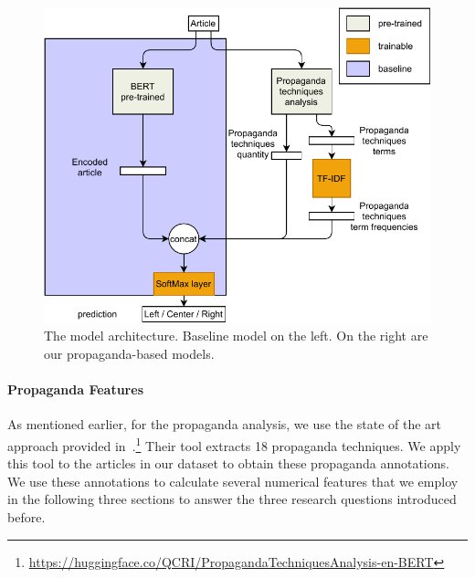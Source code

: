 \begin{figure}[!htb]
    \centering
    \includegraphics[width=\linewidth]{figures/methodology-Page-1.pdf}
    \caption{The model architecture. Baseline model on the left. On the right are our propaganda-based models.}
    \label{fig:model_classifier}
\end{figure}


\paragraph{Propaganda Features}


As mentioned earlier, for the propaganda analysis, we use the state of the art approach provided in~\citet{da2019fine}.\footnote{\url{https://huggingface.co/QCRI/PropagandaTechniquesAnalysis-en-BERT}} Their tool extracts 18 propaganda techniques. We apply this tool to the articles in our dataset to obtain these propaganda annotations. 
We use these annotations to calculate several numerical features that we employ in the following three sections to answer the three research questions introduced before.

